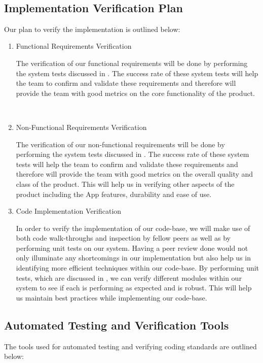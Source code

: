 \documentclass[12pt, titlepage]{article}
\begin{document}
\-\

\subsection{Implementation Verification Plan}

Our plan to verify the implementation is outlined below:
\begin{enumerate}
\item Functional Requirements Verification

\subitem The verification of our functional requirements will be done by performing the system tests discussed in . The success rate of these system tests will help the team to confirm and validate these requirements and therefore will provide the team with good metrics on the core functionality of the product.

~\newpage

\item Non-Functional Requirements Verification

\subitem The verification of our non-functional requirements will be done by performing the system tests discussed in . The success rate of these system tests will help the team to confirm and validate these requirements and therefore will provide the team with good metrics on the overall quality and class of the product. This will help us in verifying other aspects of the product including the App features, durability and ease of use.

\item Code Implementation Verification

\subitem In order to verify the implementation of our code-base, we will make use of both code walk-throughs and inspection by fellow peers as well as by performing unit tests on our system. Having a peer review done would not only illuminate any shortcomings in our implementation but also help us in identifying more efficient techniques within our code-base. By performing unit tests, which are discussed in , we can verify different modules within our system to see if each is performing as expected and is robust. This will help us maintain best practices while implementing our code-base.

\end{enumerate}

\subsection{Automated Testing and Verification Tools}
The tools used for automated testing and verifying coding standards are outlined below:
\end{document}
